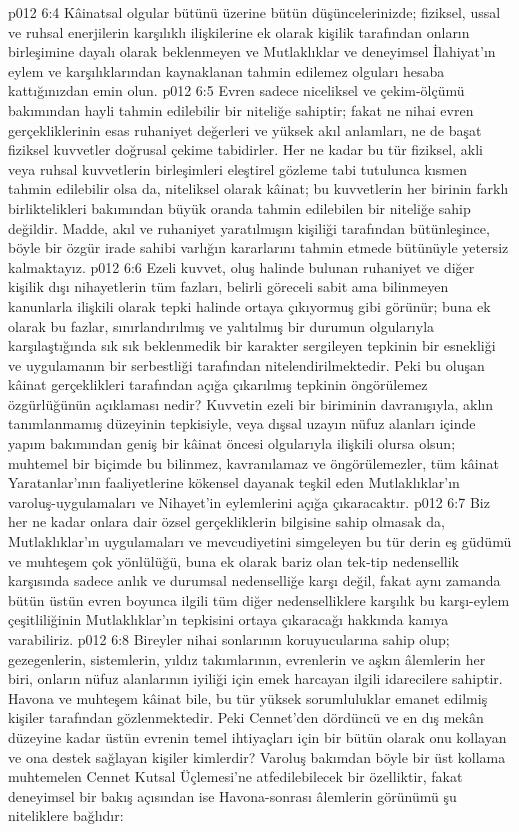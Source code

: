 \vs p012 6:4 Kâinatsal olgular bütünü üzerine bütün düşüncelerinizde; fiziksel, ussal ve ruhsal enerjilerin karşılıklı ilişkilerine ek olarak kişilik tarafından onların birleşimine dayalı olarak beklenmeyen ve Mutlaklıklar ve deneyimsel İlahiyat’ın eylem ve karşılıklarından kaynaklanan tahmin edilemez olguları hesaba kattığınızdan emin olun.
\vs p012 6:5 Evren sadece niceliksel ve çekim\hyp{}ölçümü bakımından hayli tahmin edilebilir bir niteliğe sahiptir; fakat ne nihai evren gerçekliklerinin esas ruhaniyet değerleri ve yüksek akıl anlamları, ne de başat fiziksel kuvvetler doğrusal çekime tabidirler. Her ne kadar bu tür fiziksel, akli veya ruhsal kuvvetlerin birleşimleri eleştirel gözleme tabi tutulunca kısmen tahmin edilebilir olsa da, niteliksel olarak kâinat; bu kuvvetlerin her birinin farklı birliktelikleri bakımından büyük oranda tahmin edilebilen bir niteliğe sahip değildir. Madde, akıl ve ruhaniyet yaratılmışın kişiliği tarafından bütünleşince, böyle bir özgür irade sahibi varlığın kararlarını tahmin etmede bütünüyle yetersiz kalmaktayız.
\vs p012 6:6 Ezeli kuvvet, oluş halinde bulunan ruhaniyet ve diğer kişilik dışı nihayetlerin tüm fazları, belirli göreceli sabit ama bilinmeyen kanunlarla ilişkili olarak tepki halinde ortaya çıkıyormuş gibi görünür; buna ek olarak bu fazlar, sınırlandırılmış ve yalıtılmış bir durumun olgularıyla karşılaştığında sık sık beklenmedik bir karakter sergileyen tepkinin bir esnekliği ve uygulamanın bir serbestliği tarafından nitelendirilmektedir. Peki bu oluşan kâinat gerçeklikleri tarafından açığa çıkarılmış tepkinin öngörülemez özgürlüğünün açıklaması nedir? Kuvvetin ezeli bir biriminin davranışıyla, aklın tanımlanmamış düzeyinin tepkisiyle, veya dışsal uzayın nüfuz alanları içinde yapım bakımından geniş bir kâinat öncesi olgularıyla ilişkili olursa olsun; muhtemel bir biçimde bu bilinmez, kavranılamaz ve öngörülemezler, tüm kâinat Yaratanlar’ının faaliyetlerine kökensel dayanak teşkil eden Mutlaklıklar’ın varoluş\hyp{}uygulamaları ve Nihayet’in eylemlerini açığa çıkaracaktır.
\vs p012 6:7 Biz her ne kadar onlara dair özsel gerçekliklerin bilgisine sahip olmasak da, Mutlaklıklar’ın uygulamaları ve mevcudiyetini simgeleyen bu tür derin eş güdümü ve muhteşem çok yönlülüğü, buna ek olarak bariz olan tek\hyp{}tip nedensellik karşısında sadece anlık ve durumsal nedenselliğe karşı değil, fakat aynı zamanda bütün üstün evren boyunca ilgili tüm diğer nedenselliklere karşılık bu karşı\hyp{}eylem çeşitliliğinin Mutlaklıklar’ın tepkisini ortaya çıkaracağı hakkında kanıya varabiliriz.
\vs p012 6:8 Bireyler nihai sonlarının koruyucularına sahip olup; gezegenlerin, sistemlerin, yıldız takımlarının, evrenlerin ve aşkın âlemlerin her biri, onların nüfuz alanlarının iyiliği için emek harcayan ilgili idarecilere sahiptir. Havona ve muhteşem kâinat bile, bu tür yüksek sorumluluklar emanet edilmiş kişiler tarafından gözlenmektedir. Peki Cennet’den dördüncü ve en dış mekân düzeyine kadar üstün evrenin temel ihtiyaçları için bir bütün olarak onu kollayan ve ona destek sağlayan kişiler kimlerdir? Varoluş bakımdan böyle bir üst kollama muhtemelen Cennet Kutsal Üçlemesi’ne atfedilebilecek bir özelliktir, fakat deneyimsel bir bakış açısından ise Havona\hyp{}sonrası âlemlerin görünümü şu niteliklere bağlıdır:
